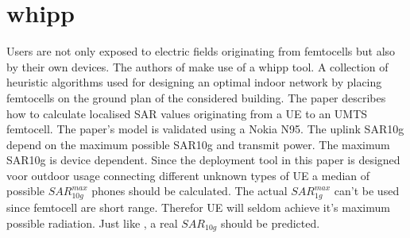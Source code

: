 \section{whipp}
Users are not only exposed to electric fields originating from femtocells but also by their own devices. The authors of \cite{J10_RDP} make use of a \gls{whipp} tool. A collection
of heuristic algorithms used for designing an optimal indoor network by placing femtocells on the ground plan of the considered building. The paper describes how to calculate localised SAR values originating from a \gls{UE} to an UMTS femtocell.
The paper's model is validated using a Nokia N95. The uplink SAR10g depend on the maximum possible SAR10g and transmit power. The maximum SAR10g is device dependent. Since
the deployment tool in this paper is designed voor outdoor usage connecting different unknown types of \gls{UE} a median of possible $SAR^{max}_{10g}$ phones should be calculated.
The actual $SAR^{max}_{1g}$ can't be used since femtocell are short range. Therefor \gls{UE} will seldom achieve it's maximum possible radiation. Just like \cite{J10_RDP}, a real  $SAR_{10g}$ should be predicted.